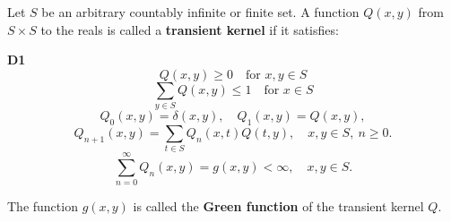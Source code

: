 Let $S$ be an arbitrary countably infinite or finite set. A function $Q(x,y)$ from $S \times S$ to the reals is called a \textbf{transient kernel} if it satisfies:

\textbf{D1}
$$Q(x,y) \geq 0 \quad \text{for } x,y \in S$$
$$\sum_{y \in S} Q(x,y) \leq 1 \quad \text{for } x \in S$$
$$Q_0(x,y) = \delta(x,y), \quad Q_1(x,y) = Q(x,y),$$
$$Q_{n+1}(x,y) = \sum_{t \in S} Q_n(x,t)Q(t,y), \quad x,y \in S, \ n \geq 0.$$
$$\sum_{n=0}^{\infty} Q_n(x,y) = g(x,y) < \infty, \quad x,y \in S.$$

The function $g(x,y)$ is called the \textbf{Green function} of the transient kernel $Q$.

